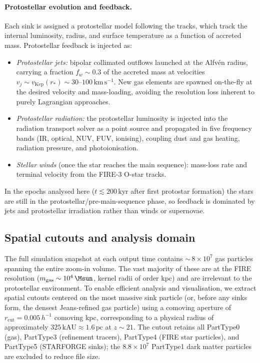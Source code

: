 \paragraph{Protostellar evolution and feedback.}
Each sink is assigned a protostellar model following the
\citet{Offner2009} tracks, which track the internal luminosity, radius,
and surface temperature as a function of accreted mass.  Protostellar
feedback is injected as:
\begin{itemize}
    \item \textit{Protostellar jets:} bipolar collimated outflows launched
          at the Alfv\'en radius, carrying a fraction $f_w\sim 0.3$ of the
          accreted mass at velocities $v_j \sim v_\mathrm{Kep}(r_*)\sim
          30$--$100\,\mathrm{km\,s^{-1}}$.  New gas elements are
          spawned on-the-fly \citep{Grudic2021} at the desired
          velocity and mass-loading, avoiding the resolution loss inherent
          to purely Lagrangian approaches.
    \item \textit{Protostellar radiation:} the protostellar luminosity
          is injected into the radiation transport solver as a point source
          and propagated in five frequency bands (IR, optical, NUV, FUV,
          ionising), coupling dust and gas heating, radiation pressure,
          and photoionisation.
    \item \textit{Stellar winds} (once the star reaches the main sequence):
          mass-loss rate and terminal velocity from the FIRE-3 O-star tracks.
\end{itemize}
In the epochs analysed here ($t \lesssim 200\,\mathrm{kyr}$ after first
protostar formation) the stars are still in the protostellar/pre-main-sequence
phase, so feedback is dominated by jets and protostellar irradiation rather
than winds or supernovae.

\subsection{Spatial cutouts and analysis domain}
\label{sec:cutouts}

The full simulation snapshot at each output time contains
${\sim}\,8\times10^7$ gas particles spanning the entire zoom-in volume.
The vast majority of these are at the FIRE resolution
($m_\mathrm{gas}\sim 10^4\,\Msun$, kernel radii of order kpc)
and are irrelevant to the protostellar environment.  To enable efficient
analysis and visualisation, we extract spatial cutouts centered on the most
massive sink particle (or, before any sinks form, the densest Jeans-refined
gas particle) using a comoving aperture of $r_\mathrm{cut} = 0.005\,h^{-1}$
comoving kpc, corresponding to a physical radius of approximately
$325\,\mathrm{kAU} \approx 1.6\,\mathrm{pc}$ at $z\sim21$.
The cutout retains all PartType0 (gas), PartType3 (refinement tracers),
PartType4 (FIRE star particles), and PartType5 (STARFORGE sinks);
the $8.8\times10^7$ PartType1 dark matter particles are excluded to reduce
file size.

